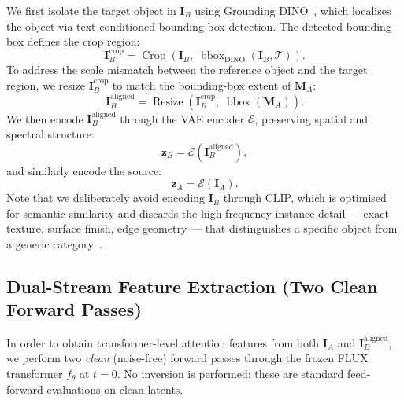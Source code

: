 We first isolate the target object in $\mathbf{I}_B$ using Grounding
DINO~\cite{liu2023grounding}, which localises the object via text-conditioned
bounding-box detection.
The detected bounding box defines the crop region:
\begin{equation}
    \mathbf{I}_B^{\text{crop}} = \operatorname{Crop}\!\left(\mathbf{I}_B,\;
        \operatorname{bbox}_{\text{DINO}}(\mathbf{I}_B, \mathcal{T})\right).
    \label{eq:crop}
\end{equation}
To address the scale mismatch between the reference object and the target region, we resize
$\mathbf{I}_B^{\text{crop}}$ to match the bounding-box extent of $\mathbf{M}_A$:
\begin{equation}
    \mathbf{I}_B^{\text{aligned}} =
        \operatorname{Resize}\!\left(
            \mathbf{I}_B^{\text{crop}},\;
            \operatorname{bbox}(\mathbf{M}_A)
        \right).
    \label{eq:resize}
\end{equation}
We then encode $\mathbf{I}_B^{\text{aligned}}$ through the VAE encoder $\mathcal{E}$,
preserving spatial and spectral structure:
\begin{equation}
    \mathbf{z}_B = \mathcal{E}\!\left(\mathbf{I}_B^{\text{aligned}}\right),
    \label{eq:ref_vae}
\end{equation}
and similarly encode the source:
\begin{equation}
    \mathbf{z}_A = \mathcal{E}(\mathbf{I}_A).
    \label{eq:src_vae}
\end{equation}
Note that we deliberately avoid encoding $\mathbf{I}_B$ through CLIP, which is optimised
for semantic similarity and discards the high-frequency instance detail — exact texture,
surface finish, edge geometry — that distinguishes a specific object from a generic
category~\cite{radford2021clip}.

\subsection{Dual-Stream Feature Extraction (Two Clean Forward Passes)}

In order to obtain transformer-level attention features from both $\mathbf{I}_A$ and
$\mathbf{I}_B^{\text{aligned}}$, we perform two \emph{clean} (noise-free) forward passes
through the frozen FLUX transformer $f_\theta$ at $t = 0$.
No inversion is performed; these are standard feed-forward evaluations on clean latents.

